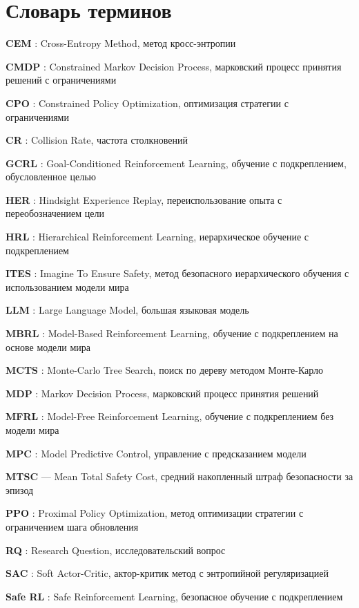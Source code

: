 \chapter*{Словарь терминов}             %

\textbf{CEM} : Cross-Entropy Method, метод кросс-энтропии

\textbf{CMDP} : Constrained Markov Decision Process, марковский процесс принятия решений с ограничениями

\textbf{CPO} : Constrained Policy Optimization, оптимизация стратегии с ограничениями

\textbf{CR} : Collision Rate, частота столкновений

\textbf{GCRL} : Goal-Conditioned Reinforcement Learning, обучение с подкреплением, обусловленное целью

\textbf{HER} : Hindsight Experience Replay, переиспользование опыта с переобозначением цели

\textbf{HRL} : Hierarchical Reinforcement Learning, иерархическое обучение с подкреплением

\textbf{ITES} : Imagine To Ensure Safety, метод безопасного иерархического обучения с использованием модели мира

\textbf{LLM} : Large Language Model, большая языковая модель

\textbf{MBRL} : Model-Based Reinforcement Learning, обучение с подкреплением на основе модели мира

\textbf{MCTS} : Monte-Carlo Tree Search, поиск по дереву методом Монте-Карло

\textbf{MDP} : Markov Decision Process, марковский процесс принятия решений

\textbf{MFRL} : Model-Free Reinforcement Learning, обучение с подкреплением без модели мира

\textbf{MPC} : Model Predictive Control, управление с предсказанием модели

\textbf{MTSC} --- Mean Total Safety Cost, средний накопленный штраф безопасности за эпизод

\textbf{PPO} : Proximal Policy Optimization, метод оптимизации стратегии с ограничением шага обновления

\textbf{RQ} : Research Question, исследовательский вопрос

\textbf{SAC} : Soft Actor-Critic, актор-критик метод с энтропийной регуляризацией

\textbf{Safe RL} : Safe Reinforcement Learning, безопасное обучение с подкреплением

